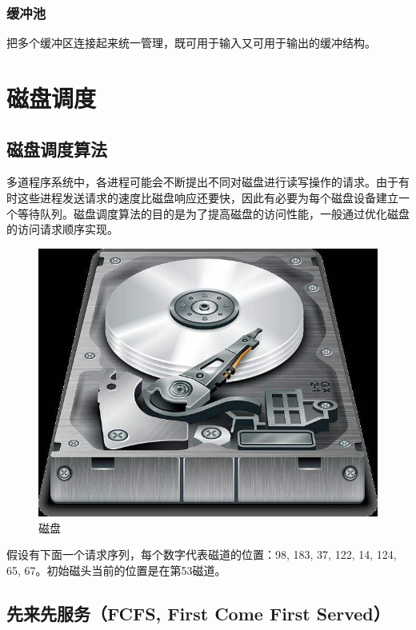 \subsubsection{缓冲池}

把多个缓冲区连接起来统一管理，既可用于输入又可用于输出的缓冲结构。

\newpage

\section{磁盘调度}

\subsection{磁盘调度算法}

多道程序系统中，各进程可能会不断提出不同对磁盘进行读写操作的请求。由于有时这些进程发送请求的速度比磁盘响应还要快，因此有必要为每个磁盘设备建立一个等待队列。磁盘调度算法的目的是为了提高磁盘的访问性能，一般通过优化磁盘的访问请求顺序实现。

\begin{figure}[H]
    \centering
    \includegraphics[scale=0.5]{img/C4/4-4/1.png}
    \caption{磁盘}
\end{figure}

假设有下面一个请求序列，每个数字代表磁道的位置：98, 183, 37, 122, 14, 124, 65, 67。初始磁头当前的位置是在第53磁道。\\

\subsection{先来先服务（FCFS, First Come First Served）}

